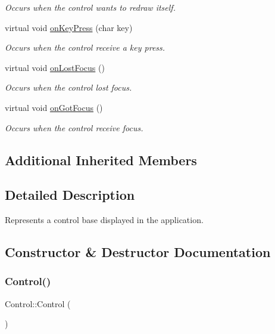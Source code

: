 \begin{DoxyCompactItemize}
\begin{DoxyCompactList}\small\item\em Occurs when the control wants to redraw itself. \end{DoxyCompactList}\item 
virtual void \mbox{\hyperlink{class_control_a4731a62a9ea0510d51924509ae74c93e}{on\+Key\+Press}} (char key)
\begin{DoxyCompactList}\small\item\em Occurs when the control receive a key press. \end{DoxyCompactList}\item 
virtual void \mbox{\hyperlink{class_control_abbc8ce4460f790b4a5cf3dcb102b3f46}{on\+Lost\+Focus}} ()
\begin{DoxyCompactList}\small\item\em Occurs when the control lost focus. \end{DoxyCompactList}\item 
virtual void \mbox{\hyperlink{class_control_ac21652bd9bd20bd53eeab52432556a0c}{on\+Got\+Focus}} ()
\begin{DoxyCompactList}\small\item\em Occurs when the control receive focus. \end{DoxyCompactList}\end{DoxyCompactItemize}
\subsection*{Additional Inherited Members}


\subsection{Detailed Description}
Represents a control base displayed in the application. 



\subsection{Constructor \& Destructor Documentation}
\mbox{\label{class_control_aa730aeda4517f40bc48ba1e46ebded77}} 
\subsubsection{\texorpdfstring{Control()}{Control()}}
{\footnotesize\ttfamily Control\+::\+Control (\begin{DoxyParamCaption}{ }\end{DoxyParamCaption})}



